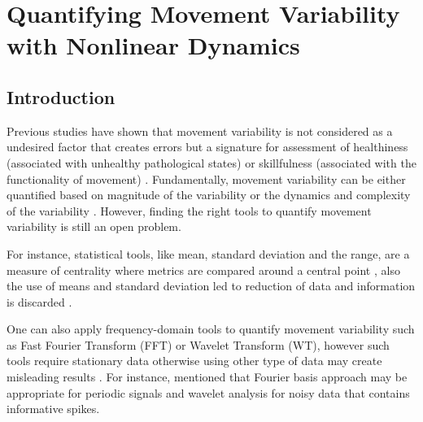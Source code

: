 


\section{Quantifying Movement Variability with Nonlinear Dynamics}


\subsection{Introduction}
Previous studies have shown that movement variability is not considered 
as a undesired factor that creates errors but a signature for 
assessment of healthiness (associated with unhealthy pathological states) 
or skillfulness (associated with the functionality of movement) \citep{stergiou2011}.
Fundamentally, movement variability can be either quantified based 
on magnitude of the variability or the dynamics 
and complexity of the variability \citep{caballero2014}.
However, finding the right tools to quantify movement variability is still an open problem. 

For instance, statistical tools, like mean, standard deviation and the range, are 
a measure of centrality where metrics are compared around a central point \citep{stergiou2011},
also the use of means and standard deviation led to reduction 
of data and information is discarded \citep{coffey2011}.

One can also apply frequency-domain tools to quantify movement variability 
such as Fast Fourier Transform (FFT) or Wavelet Transform (WT), 
however such tools require stationary data otherwise 
using other type of data may create misleading results \citep{klonowski2002, klonowski2007, klonowski2009}.
For instance, \cite{preatoni2013} mentioned that Fourier basis approach may be appropriate 
for periodic signals and wavelet analysis for noisy data that contains informative spikes.

